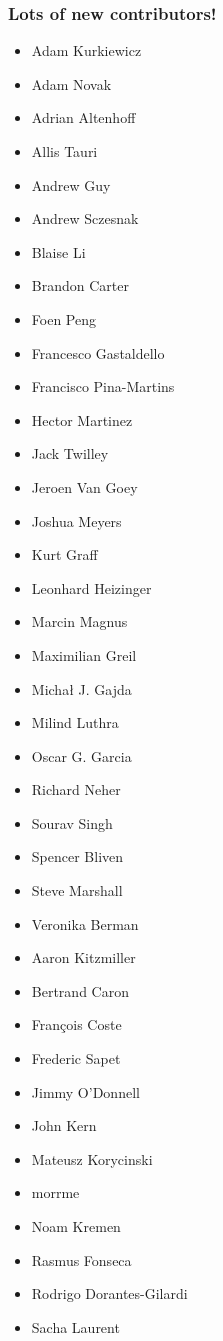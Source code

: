\documentclass[trans]{beamer}
\begin{document}
{
  \frametitle{Lots of new contributors!}
  
  \scriptsize{
  \begin{multicols}{3}
  \begin{itemize}
  
  \item Adam Kurkiewicz 
  \item Adam Novak
  \item Adrian Altenhoff
  \item Allis Tauri
  \item Andrew Guy
  \item Andrew Sczesnak
  \item Blaise Li
  \item Brandon Carter
  \item Foen Peng
  \item Francesco Gastaldello
  \item Francisco Pina-Martins
  \item Hector Martinez
  \item Jack Twilley
  \item Jeroen Van Goey
  \item Joshua Meyers
  \item Kurt Graff
  \item Leonhard Heizinger
  \item Marcin Magnus
  \item Maximilian Greil
  \item Michał J. Gajda
  \item Milind Luthra
  \item Oscar G. Garcia
  \item Richard Neher
  \item Sourav Singh
  \item Spencer Bliven
  \item Steve Marshall
  \item Veronika Berman
  
  \item Aaron Kitzmiller
  \item Bertrand Caron
  \item François Coste
  \item Frederic Sapet
  \item Jimmy O'Donnell
  \item John Kern
  \item Mateusz Korycinski
  \item morrme
  \item Noam Kremen
  \item Rasmus Fonseca
  \item Rodrigo Dorantes-Gilardi
  \item Sacha Laurent
  \end{itemize}
  \end{multicols}
  }
}
\end{document}
